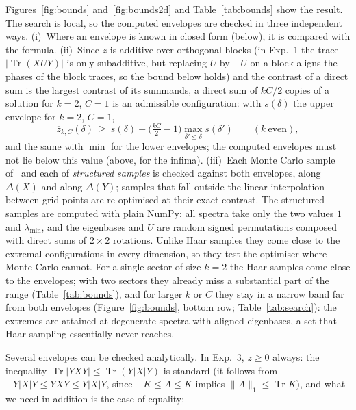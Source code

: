 \documentclass[11pt]{article}
\DeclareMathOperator{\Tr}{Tr}
\begin{document}
Figures~\ref{fig:bounds} and~\ref{fig:bounds2d} and Table~\ref{tab:bounds} show the result. The search is local,
so the computed envelopes are checked in three independent ways. (i)~Where an
envelope is known in closed form (below), it is compared with the formula. (ii)~Since $z$ is additive over
orthogonal blocks (in Exp.~1 the trace $|\Tr(XUY)|$ is only subadditive, but replacing $U$ by $-U$ on a block aligns
the phases of the block traces, so the bound below holds) and the contrast of a direct sum is the largest contrast of
its summands, a direct sum of
$kC/2$ copies of a solution for $k=2$, $C=1$ is an admissible configuration: with $s(\delta)$ the upper envelope
for $k=2$, $C=1$,
\[
  \overline z_{k,C}(\delta)\ \ge\ s(\delta)+\bigl(\tfrac{kC}2-1\bigr)\max_{\delta'\le\delta}s(\delta')\qquad(k\ \text{even}),
\]
and the same with $\min$ for the lower envelopes; the computed envelopes must not lie below this value (above, for
the infima). (iii)~Each Monte Carlo sample of~\cite{v1} and each of
 \emph{structured samples} is checked against
both envelopes, along $\Delta(X)$ and along $\Delta(Y)$; samples that fall outside the linear interpolation between
grid points are re-optimised at their exact contrast. The structured samples are computed with plain NumPy: all
spectra take only the two values $1$ and $\lambda_{\min}$, and the eigenbases and $U$ are random signed permutations
composed with direct sums of $2\times2$ rotations. Unlike Haar samples they come close to the extremal
configurations in every dimension, so they test the optimiser where Monte Carlo cannot.
 For a single sector of size $k=2$ the Haar samples come close
to the envelopes; with two sectors they already miss a substantial part of the range (Table~\ref{tab:bounds}), and
for larger $k$ or $C$ they stay in a narrow band far from both envelopes (Figure~\ref{fig:bounds}, bottom row; Table~\ref{tab:search}):
the extremes are attained at degenerate spectra with aligned eigenbases, a set that Haar sampling essentially never
reaches.

Several envelopes can be checked analytically. In Exp.~3, $z\ge0$ always: the inequality $\Tr|YXY|\le\Tr(Y|X|Y)$ is
standard (it follows from $-Y|X|Y\le YXY\le Y|X|Y$, since $-K\le A\le K$ implies $\|A\|_1\le\Tr K$), and what we
need in addition is the case of equality:
\end{document}
